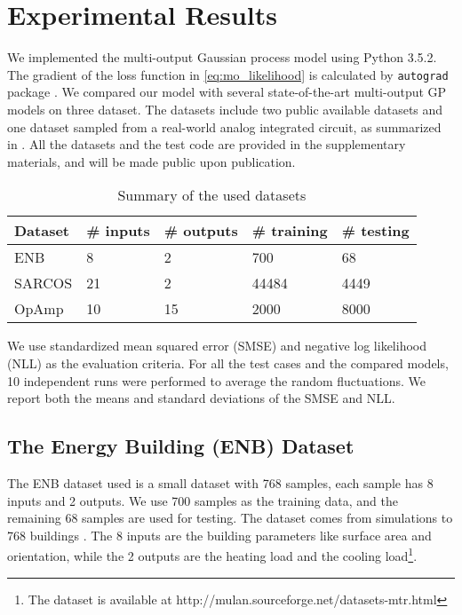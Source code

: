 \section{Experimental Results}\label{sec:experiments}


We implemented the multi-output Gaussian process model using Python 3.5.2. The gradient of the loss function in \eqref{eq:mo_likelihood} is calculated by \texttt{autograd} package \cite{maclaurin2015autograd}. We compared our model with several state-of-the-art multi-output GP models on three dataset. The datasets include two public available datasets and one dataset sampled from a real-world analog integrated circuit, as summarized in . All the datasets and the test code are provided in the supplementary materials, and will be made public upon publication.

\begin{table}[!htb]
    \centering
    \caption{Summary of the used datasets}
    \label{tab:datasets}
    \begin{tabular}{lllll}
        \toprule
        Dataset & \# inputs & \# outputs & \# training & \# testing \\ \midrule
        ENB    & 8         & 2          & 700         & 68  \\
        SARCOS & 21        & 2          & 44484       & 4449 \\
        OpAmp  & 10        & 15         & 2000        & 8000 \\
        \bottomrule
    \end{tabular}
\end{table}
We use standardized mean squared error (SMSE) and negative log likelihood (NLL) as the evaluation criteria. For all the test cases and the compared models, 10 independent runs were performed to average the random fluctuations. We report both the means and standard deviations of the SMSE and NLL.

\subsection{The Energy Building (ENB) Dataset}\label{sec:enb}

The ENB dataset used is a small dataset with 768 samples, each sample has 8 inputs and 2 outputs. We use 700 samples as the training data, and the remaining 68 samples are used for testing. The dataset comes from simulations to 768 buildings \cite{spyromitros2016multi, tsanas2012accurate}. The 8 inputs are the building parameters like surface area and orientation, while the 2 outputs are the heating load and the cooling load\footnote{The dataset is available at http://mulan.sourceforge.net/datasets-mtr.html}.

